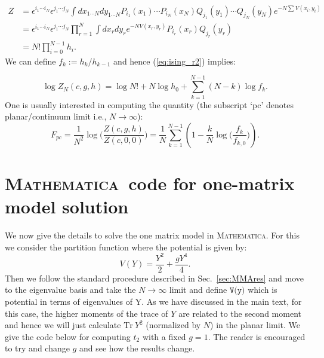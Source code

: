 \documentclass[letter,11pt]{article}
\newcommand{\MA}{\textsc{Mathematica}}
\begin{document}
\begin{align}
	Z &= \epsilon^{i_1 \cdots i_N} \epsilon^{j_1 \cdots j_N} \int dx_{1 \cdots N}
	dy_{1 \cdots N} P_{i_{1}}(x_1) \cdots P_{i_{N}}(x_N)
	Q_{j_{1}}(y_1) \cdots Q_{j_{N}}(y_N)
	e^{-N \sum V(x_i,y_i)} \nonumber  \\  
	&= \epsilon^{i_1 \cdots i_N} \epsilon^{j_1 \cdots j_N} \prod_{r=1}^{N} \int dx_{r} dy_{r} e^{-N V(x_r, y_r)} P_{i_r}(x_r) Q_{j_r}(y_r) \nonumber  \\  
	&=  N! \prod_{i=0}^{N-1} h_{i}.  
	\label{eq:ising_r2}
\end{align}
We can define $f_{k} := h_k/h_{k-1}$ and hence 
(\ref{eq:ising_r2}) implies:

\begin{equation}
	\log Z_{N}(c,g,h) = \log N! + N \log h_0 + \sum_{k=1}^{N-1} (N-k) \log f_{k} . 
\end{equation}
One is usually interested in computing the quantity (the subscript `pc' denotes planar/continuum limit i.e., $ N \to \infty$):
\begin{equation}
	F_{pc} = \frac{1}{N^2} \log\Bigg( \frac{Z(c,g,h)}{Z(c,0,0)}\Bigg) = \frac{1}{N} \sum_{k=1}^{N-1} \left(1 - \frac{k}{N} \log \Big(\frac{f_k}{f_{k,0}}\Big)\right). 
\end{equation}

\section{\label{sec:math_code}\MA~code for one-matrix model solution}

We now give the details to solve the one matrix model in \MA. For this we consider the partition function where the potential is given by:
\[ V(Y) = \frac{Y^2}{2} + \frac{gY^4}{4}.\] 
Then we follow the standard procedure described in Sec.~\ref{sec:MMAres} and move to the eigenvalue basis and take the $N \to \infty$ limit and define $\texttt{V(y)}$ which is potential in terms of eigenvalues of Y. As we have discussed in the main text, for this case, the higher moments of the trace of $Y$ are related to the second moment and hence we will just calculate $\mbox{Tr}~Y^2$ (normalized by $N$) in the planar limit. We give the code below for computing $t_{2}$ with a fixed $g=1$. The reader is encouraged to try and change $g$ and see how the results change.
\end{document}

